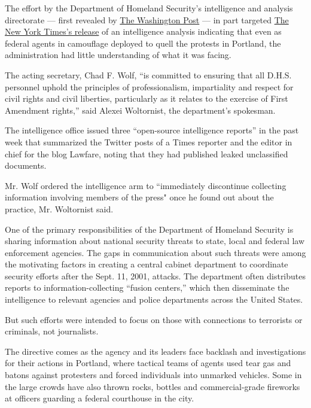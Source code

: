 The effort by the Department of Homeland Security's intelligence and
analysis directorate --- first revealed by
\href{https://www.washingtonpost.com/national-security/dhs-compiled-intelligence-reports-on-journalists-who-published-leaked-documents/2020/07/30/5be5ec9e-d25b-11ea-9038-af089b63ac21_story.html}{The
Washington Post} --- in part targeted
\href{https://www.nytimes3xbfgragh.onion/2020/07/28/us/federal-agents-portland-seattle-protests.html}{The
New York Times's release} of an intelligence analysis indicating that
even as federal agents in camouflage deployed to quell the protests in
Portland, the administration had little understanding of what it was
facing.

The acting secretary, Chad F. Wolf, ``is committed to ensuring that all
D.H.S. personnel uphold the principles of professionalism, impartiality
and respect for civil rights and civil liberties, particularly as it
relates to the exercise of First Amendment rights,'' said Alexei
Woltornist, the department's spokesman.

The intelligence office issued three ``open-source intelligence
reports'' in the past week that summarized the Twitter posts of a Times
reporter and the editor in chief for the blog Lawfare, noting that they
had published leaked unclassified documents.

Mr. Wolf ordered the intelligence arm to ``immediately discontinue
collecting information involving members of the press" once he found out
about the practice, Mr. Woltornist said.

One of the primary responsibilities of the Department of Homeland
Security is sharing information about national security threats to
state, local and federal law enforcement agencies. The gaps in
communication about such threats were among the motivating factors in
creating a central cabinet department to coordinate security efforts
after the Sept. 11, 2001, attacks. The department often distributes
reports to information-collecting ``fusion centers,'' which then
disseminate the intelligence to relevant agencies and police departments
across the United States.

But such efforts were intended to focus on those with connections to
terrorists or criminals, not journalists.

The directive comes as the agency and its leaders face backlash and
investigations for their actions in Portland, where tactical teams of
agents used tear gas and batons against protesters and forced
individuals into unmarked vehicles. Some in the large crowds have also
thrown rocks, bottles and commercial-grade fireworks at officers
guarding a federal courthouse in the city.

